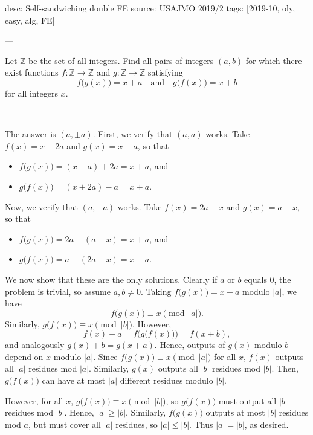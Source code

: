 desc: Self-sandwiching double FE
source: USAJMO 2019/2
tags: [2019-10, oly, easy, alg, FE]

---

Let $\mathbb Z$ be the set of all integers. Find all pairs of integers $(a,b)$ for which there exist functions $f:\mathbb Z\to\mathbb Z$ and $g:\mathbb Z\to\mathbb Z$ satisfying \[f\big(g(x)\big)=x+a\quad\text{and}\quad g\big(f(x)\big)=x+b\]
for all integers $x$.

---

The answer is $(a,\pm a)$. First, we verify that $(a,a)$ works. Take $f(x)=x+2a$ and $g(x)=x-a$, so that
\begin{itemize}[itemsep=0em]
    \item $f\big(g(x)\big)=(x-a)+2a=x+a$, and
    \item $g\big(f(x)\big)=(x+2a)-a=x+a$.
\end{itemize}
Now, we verify that $(a,-a)$ works. Take $f(x)=2a-x$ and $g(x)=a-x$, so that
\begin{itemize}[itemsep=0em]
    \item $f\big(g(x)\big)=2a-(a-x)=x+a$, and
    \item $g\big(f(x)\big)=a-(2a-x)=x-a$.
\end{itemize}
We now show that these are the only solutions. Clearly if $a$ or $b$ equals $0$, the problem is trivial, so assume $a,b\ne 0$. Taking $f\big(g(x)\big)=x+a$ modulo $|a|$, we have \[f\big(g(x)\big)\equiv x\pmod{|a|}.\]
Similarly, $g\big(f(x)\big)\equiv x\pmod{|b|}$. However, \[f(x)+a=f\Big(g\big(f(x)\big)\Big)=f(x+b),\]
and analogously $g(x)+b=g(x+a)$. Hence, outputs of $g(x)$ modulo $b$ depend on $x$ modulo $|a|$. Since $f\big(g(x)\big)\equiv x\pmod{|a|}$ for all $x$, $f(x)$ outputs all $|a|$ residues mod $|a|$. Similarly, $g(x)$ outputs all $|b|$ residues mod $|b|$. Then, $g\big(f(x)\big)$ can have at most $|a|$ different residues modulo $|b|$.

However, for all $x$, $g\big(f(x)\big)\equiv x\pmod{|b|}$, so $g\big(f(x)\big)$ must output all $|b|$ residues mod $|b|$. Hence, $|a|\ge |b|$. Similarly, $f\big(g(x)\big)$ outputs at most $|b|$ residues mod $a$, but must cover all $|a|$ residues, so $|a|\le |b|$. Thus $|a|=|b|$, as desired.
